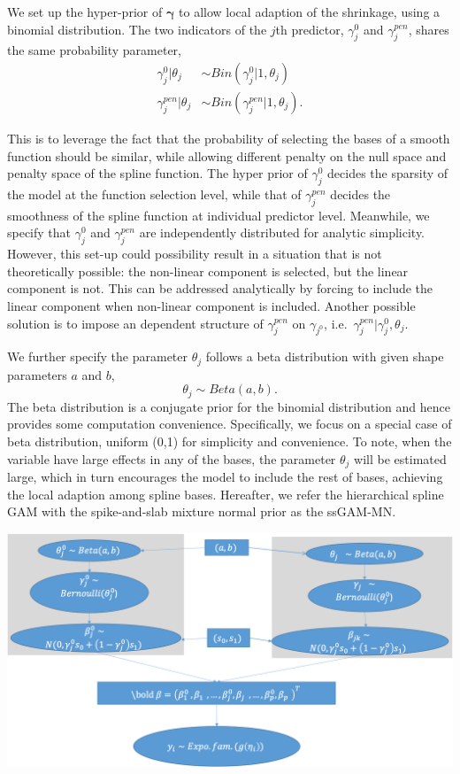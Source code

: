 \documentclass[AMA,STIX1COL,]{WileyNJD-v2}
\begin{document}
We set up the hyper-prior of \(\boldsymbol{\gamma}\) to allow local
adaption of the shrinkage, using a binomial distribution. The two
indicators of the \(j\)th predictor, \(\gamma^{0}_j\) and
\(\gamma^{pen}_j\), shares the same probability parameter, \[
\begin{aligned}
\gamma_{j}^{0} | \theta_j &\sim Bin(\gamma^{0}_{j}|1, \theta_j)\\
\gamma_{j}^{pen} | \theta_j &\sim Bin(\gamma^{pen}_{j}|1, \theta_j).
\end{aligned}
\]

This is to leverage the fact that the probability of selecting the bases
of a smooth function should be similar, while allowing different penalty
on the null space and penalty space of the spline function. The hyper
prior of \(\gamma_{j}^{0}\) decides the sparsity of the model at the
function selection level, while that of \(\gamma_{j}^{pen}\) decides the
smoothness of the spline function at individual predictor level.
Meanwhile, we specify that \(\gamma_{j}^0\) and \(\gamma_{j}^{pen}\) are
independently distributed for analytic simplicity. However, this set-up
could possibility result in a situation that is not theoretically
possible: the non-linear component is selected, but the linear component
is not. This can be addressed analytically by forcing to include the
linear component when non-linear component is included. Another possible
solution is to impose an dependent structure of \(\gamma_{j}^{pen}\) on
\(\gamma_{j^{0}}\), i.e.~\(\gamma_j^{pen}|\gamma_{j}^{0}, \theta_j\).

We further specify the parameter \(\theta_j\) follows a beta
distribution with given shape parameters \(a\) and \(b\), \[
\theta_j \sim Beta(a, b).
\] The beta distribution is a conjugate prior for the binomial
distribution and hence provides some computation convenience.
Specifically, we focus on a special case of beta distribution, uniform
(0,1) for simplicity and convenience. To note, when the variable have
large effects in any of the bases, the parameter \(\theta_j\) will be
estimated large, which in turn encourages the model to include the rest
of bases, achieving the local adaption among spline bases. Hereafter, we
refer the hierarchical spline GAM with the spike-and-slab mixture normal
prior as the ssGAM-MN.

\includegraphics{Fig/SS_prior_flow_chart.png}
\end{document}
